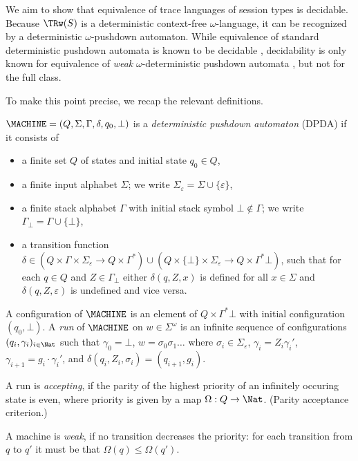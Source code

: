 We aim to show that equivalence of trace languages of session types is decidable.
Because $\TRw (S)$ is a deterministic context-free $\omega$-language, it can be recognized by
a deterministic $\omega$-pushdown automaton. While equivalence of standard deterministic
pushdown automata is known to be decidable \cite{DBLP:conf/icalp/Senizergues97}, decidability is only
known for equivalence of \emph{weak} $\omega$-deterministic pushdown automata \cite{DBLP:conf/mfcs/LodingR12}, but
not for the full class.

To make this point precise, we recap the relevant definitions.
\begin{definition}
  $\MACHINE= (Q, \Sigma, \Gamma, \delta, q_0, \bot)$ is
  a \emph{deterministic pushdown automaton} (DPDA) if it consists of
  \begin{itemize}
  \item a finite set $Q$ of states and initial state $q_0\in Q$,
  \item a finite input alphabet $\Sigma$; we write $\Sigma_\varepsilon = \Sigma \cup\{\varepsilon\}$,
  \item a finite stack alphabet $\Gamma$ with initial stack symbol $\bot\notin\Gamma$; we write
    $\Gamma_\bot = \Gamma\cup\{\bot\}$,
  \item a transition function
    $\delta \in (Q \times \Gamma \times \Sigma_\varepsilon \to Q  \times \Gamma^*)
    \cup (Q \times \{\bot\} \times \Sigma_\varepsilon \to Q \times  \Gamma^*\bot)$, such that for each $q \in Q$ and
    $Z\in \Gamma_\bot$ either
    $\delta (q, Z, x)$ is defined for all $x \in\Sigma$ and $\delta (q, Z, \varepsilon)$ is
    undefined and vice versa.
  \end{itemize}
  A configuration of $\MACHINE$ is an element of $Q \times \Gamma^*\bot$ with initial
  configuration $(q_0,\bot)$. A \emph{run} of $\MACHINE$ on $w \in \Sigma^\omega$ is an infinite sequence
  of configurations $(q_i,\gamma_i)_{i\in\Nat}$ such that $\gamma_0 = \bot$, $w =
  \sigma_0\sigma_1 \dots$ where $\sigma_i \in \Sigma_\varepsilon$, 
  $\gamma_i = Z_i\gamma_i'$, $\gamma_{i+1} = g_i\cdot\gamma_i'$, and $\delta (q_i, Z_i, \sigma_i) =
  (q_{i+1}, g_i)$.

  A run is \emph{accepting}, if the parity of the highest priority of an infinitely occuring state
  is even, where priority is given by a map $\Omega : Q \to \Nat$. (Parity acceptance criterion.)

  A machine is \emph{weak}, if no transition decreases the priority: for each transition from $q$ to
  $q'$ it must be that $\Omega (q) \le \Omega (q')$.
\end{definition}


